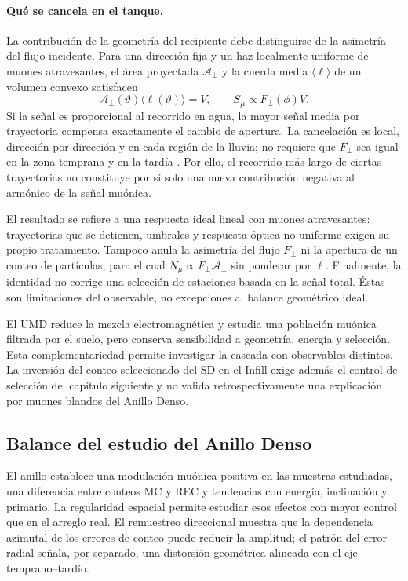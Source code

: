 \paragraph{Qué se cancela en el tanque.}
La contribución de la geometría del recipiente debe distinguirse de la asimetría del flujo incidente. Para una dirección fija y un haz localmente uniforme de muones atravesantes, el área proyectada $\mathcal A_\perp$ y la cuerda media $\langle\ell\rangle$ de un volumen convexo satisfacen
\begin{equation}
\mathcal A_\perp(\vartheta)\langle\ell(\vartheta)\rangle=V,
\qquad
S_\mu\propto F_\perp(\phi)V.
\label{eq:dense2026_tanque}
\end{equation}
Si la señal es proporcional al recorrido en agua, la mayor señal media por trayectoria compensa exactamente el cambio de apertura. La cancelación es local, dirección por dirección y en cada región de la lluvia; no requiere que $F_\perp$ sea igual en la zona temprana y en la tardía \cite{GAP2000_017}. Por ello, el recorrido más largo de ciertas trayectorias no constituye por sí solo una nueva contribución negativa al armónico de la señal muónica.

El resultado se refiere a una respuesta ideal lineal con muones atravesantes: trayectorias que se detienen, umbrales y respuesta óptica no uniforme exigen su propio tratamiento. Tampoco anula la asimetría del flujo $F_\perp$ ni la apertura de un conteo de partículas, para el cual $N_\mu\propto F_\perp\mathcal A_\perp$ sin ponderar por $\ell$. Finalmente, la identidad no corrige una selección de estaciones basada en la señal total. Éstas son limitaciones del observable, no excepciones al balance geométrico ideal.

El UMD reduce la mezcla electromagnética y estudia una población muónica filtrada por el suelo, pero conserva sensibilidad a geometría, energía y selección. Esta complementariedad permite investigar la cascada con observables distintos. La inversión del conteo seleccionado del SD en el Infill exige además el control de selección del capítulo siguiente y no valida retrospectivamente una explicación por muones blandos del Anillo Denso.

\subsection{Balance del estudio del Anillo Denso}
\label{subsec:dense2026_balance}

El anillo establece una modulación muónica positiva en las muestras estudiadas, una diferencia entre conteos MC y REC y tendencias con energía, inclinación y primario. La regularidad espacial permite estudiar esos efectos con mayor control que en el arreglo real. El remuestreo direccional muestra que la dependencia azimutal de los errores de conteo puede reducir la amplitud; el patrón del error radial señala, por separado, una distorsión geométrica alineada con el eje temprano--tardío.

